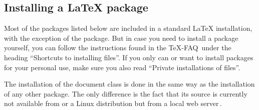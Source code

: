 \subsection{Installing a LaTeX package}\label{sec:install}
Most of the packages listed below are included in a standard LaTeX
installation, with the exception of the  package. But in case you
need to install a package yourself, you can follow the instructions found in
the TeX-FAQ\,\cite{texfaq} under the heading \enquote{Shortcuts to installing
  files}. If you only can or want to install packages for your personal use,
make sure you also read \enquote{Private installations of files}.

The installation of the document class  is done in the same way as
the installation of any other package. The only difference is the fact that its
source is currently not available from  or a Linux distribution but
from a local web server\,.

